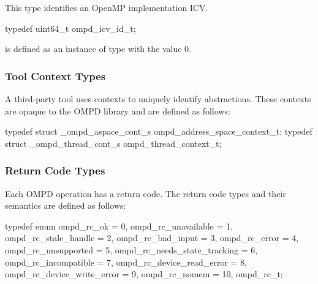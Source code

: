 \summary

This type identifies an OpenMP implementation ICV.

\format

\begin{ccppspecific}
\begin{ompSyntax}
typedef uint64_t ompd_icv_id_t;
\end{ompSyntax}
\end{ccppspecific}

 is defined as an instance of type  with 
the value 0.



\subsubsection{Tool Context Types}
\label{subsubsec:ompd_address_space_context_t}
\label{subsubsec:ompd_thread_context_t}

A third-party tool uses contexts to uniquely identify abstractions. These contexts are opaque to
the OMPD library and are defined as follows:

\format

\begin{ccppspecific}
\begin{ompSyntax}
typedef struct _ompd_aspace_cont_s ompd_address_space_context_t;
typedef struct _ompd_thread_cont_s ompd_thread_context_t;
\end{ompSyntax}
\end{ccppspecific}


\subsubsection{Return Code Types}
\label{subsubsec:ompd_rc_t}

Each OMPD operation has a return code. The return code types and their semantics are defined as
follows:

\format

\begin{ccppspecific}
\begin{ompSyntax}
typedef enum {
  ompd_rc_ok = 0,
  ompd_rc_unavailable = 1,
  ompd_rc_stale_handle = 2,
  ompd_rc_bad_input = 3,
  ompd_rc_error = 4,
  ompd_rc_unsupported = 5,
  ompd_rc_needs_state_tracking = 6,
  ompd_rc_incompatible = 7,
  ompd_rc_device_read_error = 8,
  ompd_rc_device_write_error = 9,
  ompd_rc_nomem = 10,
} ompd_rc_t;
\end{ompSyntax}
\end{ccppspecific}


